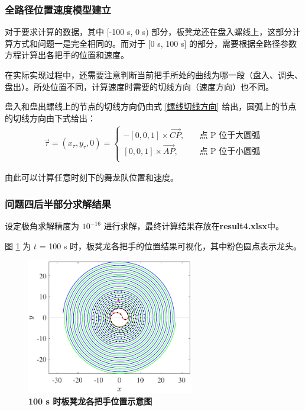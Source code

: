\documentclass[zihao=-4, UTF8]{article}		%
\theoremstyle{MyLineTheoremStyle} %
\theoremstyle{MyBlockTheoremStyle} %
\theoremstyle{MySubsubsectionStyle} %
\begin{document}
\subsubsection{全路径位置速度模型建立}

对于要求计算的数据，其中 [-100 s, 0 s) 部分，板凳龙还在盘入螺线上，这部分计算方式和问题一是完全相同的。而对于 [0 s, 100 s] 的部分，需要根据全路径参数方程计算出各把手的位置和速度。

在实际实现过程中，还需要注意判断当前把手所处的曲线为哪一段（盘入、调头、盘出）。所处位置不同，计算速度时需要的切线方向（速度方向）也不同。

盘入和盘出螺线上的节点的切线方向仍由式 \ref*{螺线切线方向} 给出，圆弧上的节点的切线方向由下式给出：
\begin{gather}
\vec{\tau} = (x_{\tau},y_{\tau}, 0) = 
\begin{cases}
    - [0, 0 , 1] \times \overrightarrow{CP},\quad & \text{点 P 位于大圆弧} \\
    [0, 0 , 1] \times \overrightarrow{AP},\quad & \text{点 P 位于小圆弧} \\
\end{cases}
\end{gather}

由此可以计算任意时刻下的舞龙队位置和速度。

\subsubsection{问题四后半部分求解结果}

设定极角求解精度为 $10^{-16}$ 进行求解，最终计算结果存放在\textbf{result4.xlsx}中。

图 \ref*{100 s 时板凳龙各把手位置示意图} 为 $t$ = 100 s 时，板凳龙各把手的位置结果可视化，其中粉色圆点表示龙头。

\begin{figure}[H]
    \centering
    \includegraphics[width=0.65\textwidth]{assets/t4circle_100.pdf}
    \caption{\textbf{100 s 时板凳龙各把手位置示意图}}
    \label{100 s 时板凳龙各把手位置示意图}
\end{figure}
\end{document}
